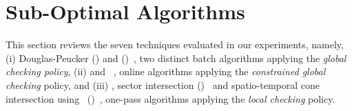\newtheorem{theorem}{Theorem}
\newtheorem{lemma}{Lemma}

\vspace{-1ex}
\section{Sub-Optimal Algorithms}
\label{sec-subopt}



This section reviews the seven techniques evaluated in our experiments, namely,
(i) Douglas-Peucker (\dpa)\cite{Douglas:Peucker,Meratnia:Spatiotemporal} and \pavlidis (\tpa)~\cite{Pavlidis:Segment}, two distinct batch algorithms applying the \emph{global checking policy},
(ii) \bqsa\cite{Liu:BQS} and \squishe~\cite{Muckell:SQUISH}, online algorithms applying the \emph{constrained global checking} policy, %
and (iii) \operb\cite{Lin:Operb}, sector intersection (\sia)~\cite{Williams:Longest,Sklansky:Cone,Dunham:Cone, Zhao:Sleeve} and spatio-temporal cone intersection using \sed~(\cia)~\cite{Lin:Cised}, one-pass algorithms applying the \emph{local checking} policy.











